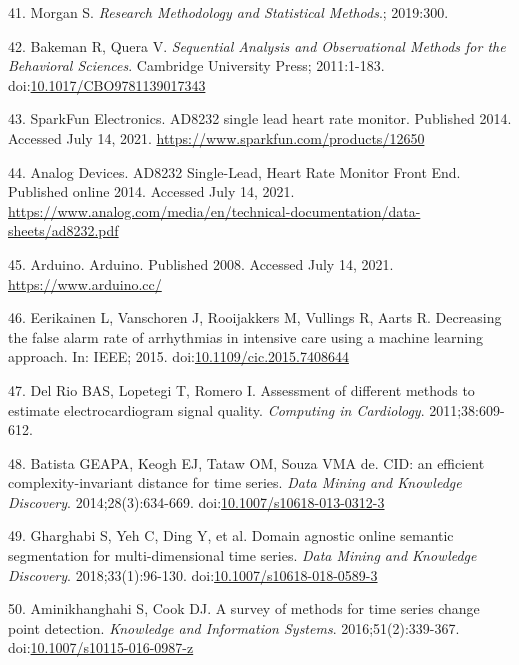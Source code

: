 \documentclass[12pt,twoside]{fmupthesis}
\begin{document}
\leavevmode\hypertarget{ref-Morgan2019}{}%
41. Morgan S. \emph{Research Methodology and Statistical Methods}.; 2019:300.

\leavevmode\hypertarget{ref-Bakeman2011}{}%
42. Bakeman R, Quera V. \emph{Sequential Analysis and Observational Methods for the Behavioral Sciences}. Cambridge University Press; 2011:1-183. doi:\href{https://doi.org/10.1017/CBO9781139017343}{10.1017/CBO9781139017343}

\leavevmode\hypertarget{ref-sparkfun2021}{}%
43. SparkFun Electronics. AD8232 single lead heart rate monitor. Published 2014. Accessed July 14, 2021. \url{https://www.sparkfun.com/products/12650}

\leavevmode\hypertarget{ref-AnalogDevices2020}{}%
44. Analog Devices. AD8232 Single-Lead, Heart Rate Monitor Front End. Published online 2014. Accessed July 14, 2021. \url{https://www.analog.com/media/en/technical-documentation/data-sheets/ad8232.pdf}

\leavevmode\hypertarget{ref-arduino2021}{}%
45. Arduino. Arduino. Published 2008. Accessed July 14, 2021. \url{https://www.arduino.cc/}

\leavevmode\hypertarget{ref-eerikainen2015}{}%
46. Eerikainen L, Vanschoren J, Rooijakkers M, Vullings R, Aarts R. Decreasing the false alarm rate of arrhythmias in intensive care using a machine learning approach. In: IEEE; 2015. doi:\href{https://doi.org/10.1109/cic.2015.7408644}{10.1109/cic.2015.7408644}

\leavevmode\hypertarget{ref-DelRio2011}{}%
47. Del Rio BAS, Lopetegi T, Romero I. Assessment of different methods to estimate electrocardiogram signal quality. \emph{Computing in Cardiology}. 2011;38:609-612.

\leavevmode\hypertarget{ref-Batista2014}{}%
48. Batista GEAPA, Keogh EJ, Tataw OM, Souza VMA de. CID: an efficient complexity-invariant distance for time series. \emph{Data Mining and Knowledge Discovery}. 2014;28(3):634-669. doi:\href{https://doi.org/10.1007/s10618-013-0312-3}{10.1007/s10618-013-0312-3}

\leavevmode\hypertarget{ref-gharghabi2018}{}%
49. Gharghabi S, Yeh C, Ding Y, et al. Domain agnostic online semantic segmentation for multi-dimensional time series. \emph{Data Mining and Knowledge Discovery}. 2018;33(1):96-130. doi:\href{https://doi.org/10.1007/s10618-018-0589-3}{10.1007/s10618-018-0589-3}

\leavevmode\hypertarget{ref-aminikhanghahi2016}{}%
50. Aminikhanghahi S, Cook DJ. A survey of methods for time series change point detection. \emph{Knowledge and Information Systems}. 2016;51(2):339-367. doi:\href{https://doi.org/10.1007/s10115-016-0987-z}{10.1007/s10115-016-0987-z}
\end{document}
